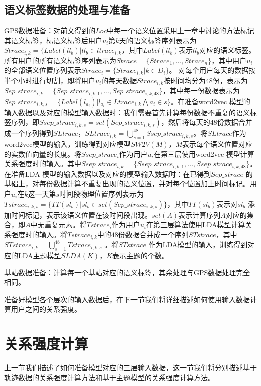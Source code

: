 \subsection{语义标签数据的处理与准备}
GPS数据准备：对前文得到的$Loc$中每一个语义位置采用上一章中讨论的方法标记其语义标签，标语义标签后用户$u_{i}$第$k$天的语义标签序列表示为$Strace_{i,k}=\{Label(ll_{b})|ll_{b}\in ltrace_{i,k}$，其中$Label(ll_{b})$表示$ll_{b}$对应的语义标签。所有用户的所有语义标签序列表示为$Strace=\{Strace_{1},...,Strace_{n}\}$，其中用户$u_{i}$的全部语义位置序列表示$Strace_{i}=\{Strace_{i,k}|k\in D_{i}\}$。 对每个用户每天的数据按半个小时进行切割，即将用户$u_{i}$的每天数据$Strace_{i,k}$按时间均分为$48$份，表示为$Sep\_strace_{i,k}=\{Sep\_strace_{i,k,1},...,Sep\_strace_{i,k,48}\}$，其中每一份数据表示为$Sep\_strace_{i,k,s}=\{Label(l_{a_{i}})|l_{a_{i}}\in Ltrace_{i,k} \bigwedge a_{i}\in s\}$。在准备word2vec 模型的输入数据以及对应的模型输入数据时：我们需要首先计算每份数据不重复的语义标签序列，即$Ssep\_strace_{i,k,s}=set(Sep\_strace_{i,k,s})$，然后将每天的$48$份数据合并成一个序列得到$SLtrace$，$SLtrace_{i,k}=\bigcup_{s=1}^{48}Ssep\_strace_{i,k,s}$。将$SLtrace$作为word2vec模型的输入，训练得到对应模型$SW2V(M)$，$M$表示每个语义位置对应的实数值向量的长度。将$Ssep\_strace_{i}$作为用户$u_{i}$在第三层使用word2vec 模型计算关系强度时的输入。其中$Ssep\_strace_{i,k}=\{Ssep\_strace_{i,k,1},...,Ssep\_strace_{i,k,48}\}$。在准备LDA 模型的输入数据以及对应的模型输入数据时：在已得到$Sep\_strace$ 的基础上，对每份数据计算不重复出现的语义位置，并对每个位置加上时间标记。用户$u_{i}$在$k$这一天第$s$时间段物理位置序列表示为$Tstrace_{i,k,s}=\{TT(sl_{b})|sl_{b}\in set(Sep\_strace_{i,k,s})\}$，其中$TT(sl_{b})$表示对$sl_{b}$ 添加时间标记，表示该语义位置在该时间段出现。$set(A)$表示计算序列$A$对应的集合，即$A$中无重复元素。将$Tstrace_{i}$作为用户$u_{i}$在第三层算法使用LDA模型计算关系强度时的输入。将$Tstrace_{i,k}$中的$48$份数据合并成一个序列$STstrace$，其中$STstrace_{i,k}=\bigcup_{s=1}^{48}Tstrace_{i,k,s}$ 。将$STstrace$ 作为LDA模型的输入，训练得到对应的LDA主题模型$SLDA(K)$，$K$表示主题的个数。
\par 基站数据准备：计算每一个基站对应的语义标签，其余处理与GPS数据处理完全相同。
\par 准备好模型各个层次的输入数据后，在下一节我们将详细描述如何使用输入数据计算用户之间的关系强度。
\section{关系强度计算}
\label{sec:section4-3}
上一节我们描述了如何准备模型对应的三层输入数据，这一节我们将分别描述基于轨迹数据的关系强度计算方法和基于主题模型的关系强度计算方法。
